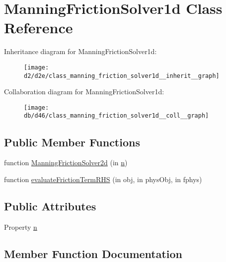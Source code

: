 \hypertarget{class_manning_friction_solver1d}{}\section{Manning\+Friction\+Solver1d Class Reference}
\label{class_manning_friction_solver1d}


Inheritance diagram for Manning\+Friction\+Solver1d\+:
\nopagebreak
\begin{figure}[H]
\begin{center}
\leavevmode
\texttt{[image: d2/d2e/class\_manning\_friction\_solver1d\_\_inherit\_\_graph]}
\end{center}
\end{figure}


Collaboration diagram for Manning\+Friction\+Solver1d\+:
\nopagebreak
\begin{figure}[H]
\begin{center}
\leavevmode
\texttt{[image: db/d46/class\_manning\_friction\_solver1d\_\_coll\_\_graph]}
\end{center}
\end{figure}
\subsection*{Public Member Functions}
\begin{DoxyCompactItemize}
\item 
function \hyperlink{class_manning_friction_solver1d_afb7befe22294e499139a18d9f8388055}{Manning\+Friction\+Solver2d} (in \hyperlink{class_manning_friction_solver1d_a3c552134a88ae80fc6a6c93380ff4e3b}{n})
\item 
function \hyperlink{class_manning_friction_solver1d_a2cc29a6a23b2be95bf7494368a83ae09}{evaluate\+Friction\+Term\+R\+HS} (in obj, in phys\+Obj, in fphys)
\end{DoxyCompactItemize}
\subsection*{Public Attributes}
\begin{DoxyCompactItemize}
\item 
Property \hyperlink{class_manning_friction_solver1d_a3c552134a88ae80fc6a6c93380ff4e3b}{n}
\end{DoxyCompactItemize}


\subsection{Member Function Documentation}
\mbox{\label{class_manning_friction_solver1d_a2cc29a6a23b2be95bf7494368a83ae09}} 
